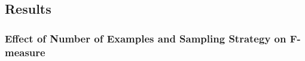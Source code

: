 \documentclass{llncs}
\begin{document}

\subsection{Results}
\subsubsection{Effect of Number of Examples and Sampling Strategy on F-measure}
\end{document}
